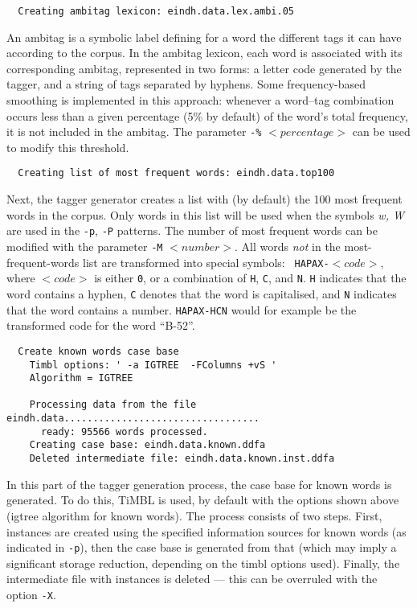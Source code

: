 \documentclass{report}
\begin{document}
{\small
\begin{verbatim}
  Creating ambitag lexicon: eindh.data.lex.ambi.05
\end{verbatim}
}

An ambitag is a symbolic label defining for a word the different
tags it can have according to the corpus.  In the ambitag lexicon,
each word is associated with its corresponding ambitag, represented in
two forms: a letter code generated by the tagger, and a string of tags
separated by hyphens. Some frequency-based smoothing is implemented in
this approach: whenever a word--tag combination occurs less than a
given percentage (5\% by default) of the word's total frequency, it is
not included in the ambitag. The parameter {\tt -\%} $<percentage>$ can be
used to modify this threshold. 

{\small
\begin{verbatim}
  Creating list of most frequent words: eindh.data.top100
\end{verbatim}
}

Next, the tagger generator creates a list with (by default) the 100
most frequent words in the corpus. Only words in this list will be
used when the symbols {\em w, W} are used in the {\tt -p}, {\tt -P}
patterns. The number of most frequent words can be modified with the
parameter {\tt -M} $<number>$. All words {\em not}\/ in the
most-frequent-words list are transformed into special symbols: {\tt
HAPAX-}$<code>$, where $<code>$ is either {\tt 0}, or a combination of
{\tt H}, {\tt C}, and {\tt N}. {\tt H} indicates that the word
contains a hyphen, {\tt C} denotes that the word is capitalised, and
{\tt N} indicates that the word contains a number. {\tt HAPAX-HCN}
would for example be the transformed code for the word ``B-52''.

{\small
\begin{verbatim}
  Create known words case base
    Timbl options: ' -a IGTREE  -FColumns +vS '
    Algorithm = IGTREE

    Processing data from the file eindh.data..................................
      ready: 95566 words processed.
    Creating case base: eindh.data.known.ddfa
    Deleted intermediate file: eindh.data.known.inst.ddfa
\end{verbatim}
}

In this part of the tagger generation process, the case base for known
words is generated. To do this, TiMBL is used, by default with
the options shown above ({\sc igtree} algorithm for known
words). The process consists of two steps. First, instances are
created using the specified information sources for known words (as
indicated in {\tt -p}), then the case base is generated from that (which
may imply a significant storage reduction, depending on the {\sc
timbl} options used). Finally, the intermediate file with instances is
deleted --- this can be overruled with the option {\tt -X}.
\end{document}
